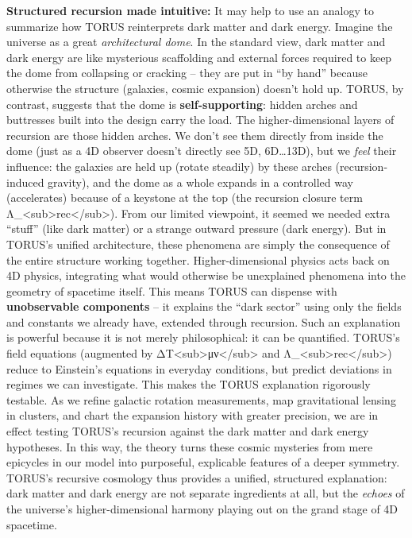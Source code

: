 \documentclass[
]{article}
\begin{document}
\textbf{Structured recursion made intuitive:} It may help to use an
analogy to summarize how TORUS reinterprets dark matter and dark energy.
Imagine the universe as a great \emph{architectural dome}. In the
standard view, dark matter and dark energy are like mysterious
scaffolding and external forces required to keep the dome from
collapsing or cracking -- they are put in ``by hand'' because otherwise
the structure (galaxies, cosmic expansion) doesn't hold up. TORUS, by
contrast, suggests that the dome is \textbf{self-supporting}: hidden
arches and buttresses built into the design carry the load. The
higher-dimensional layers of recursion are those hidden arches. We don't
see them directly from inside the dome (just as a 4D observer doesn't
directly see 5D, 6D\ldots13D), but we \emph{feel} their influence: the
galaxies are held up (rotate steadily) by these arches
(recursion-induced gravity), and the dome as a whole expands in a
controlled way (accelerates) because of a keystone at the top (the
recursion closure term
Λ\_\textless sub\textgreater rec\textless/sub\textgreater). From our
limited viewpoint, it seemed we needed extra ``stuff'' (like dark
matter) or a strange outward pressure (dark energy). But in TORUS's
unified architecture, these phenomena are simply the consequence of the
entire structure working together. Higher-dimensional physics acts back
on 4D physics, integrating what would otherwise be unexplained phenomena
into the geometry of spacetime itself\hspace{0pt}. This means TORUS can
dispense with \textbf{unobservable components} -- it explains the ``dark
sector'' using only the fields and constants we already have, extended
through recursion. Such an explanation is powerful because it is not
merely philosophical: it can be quantified. TORUS's field equations
(augmented by ΔT\textless sub\textgreater μν\textless/sub\textgreater{}
and Λ\_\textless sub\textgreater rec\textless/sub\textgreater) reduce to
Einstein's equations in everyday conditions, but predict deviations in
regimes we can investigate\hspace{0pt}. This makes the TORUS explanation
rigorously testable. As we refine galactic rotation measurements, map
gravitational lensing in clusters, and chart the expansion history with
greater precision, we are in effect testing TORUS's recursion against
the dark matter and dark energy hypotheses. In this way, the theory
turns these cosmic mysteries from mere epicycles in our model into
purposeful, explicable features of a deeper symmetry. TORUS's recursive
cosmology thus provides a unified, structured explanation: dark matter
and dark energy are not separate ingredients at all, but the
\emph{echoes} of the universe's higher-dimensional harmony playing out
on the grand stage of 4D spacetime.
\end{document}
